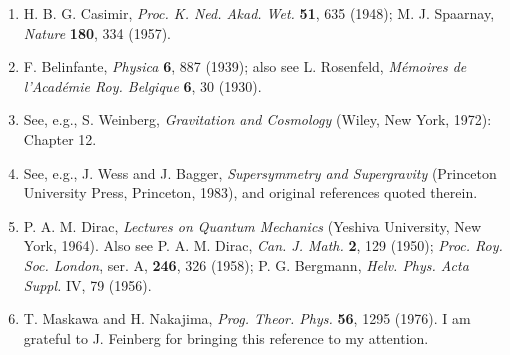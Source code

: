 
\begin{enumerate}
\item \label{ref:7.1} H. B. G. Casimir, \emph{Proc. K. Ned. Akad. Wet.} \textbf{51}, 635
(1948); M. J. Spaarnay, \emph{Nature} \textbf{180}, 334 (1957).

\item \label{ref:7.2} F. Belinfante, \emph{Physica} \textbf{6}, 887 (1939); also see
L. Rosenfeld, \emph{M\'emoires de l'Acad\'emie Roy. Belgique} \textbf{6}, 30
(1930).

\item \label{ref:7.3} See, e.g., S. Weinberg, \emph{Gravitation and Cosmology} (Wiley, New
York, 1972): Chapter 12.

\item \label{ref:7.4} See, e.g., J. Wess and J. Bagger, \emph{Supersymmetry and Supergravity}
(Princeton University Press, Princeton, 1983), and original references quoted
therein.

\item \label{ref:7.5} P. A. M. Dirac, \emph{Lectures on Quantum Mechanics} (Yeshiva
University, New York, 1964). Also see P. A. M. Dirac, \emph{Can. J. Math.}
\textbf{2}, 129 (1950); \emph{Proc. Roy. Soc. London}, ser. A, \textbf{246},
326 (1958); P. G. Bergmann, \emph{Helv. Phys. Acta Suppl.} IV, 79 (1956).

\item \label{ref:7.6} T. Maskawa and H. Nakajima, \emph{Prog. Theor. Phys.} \textbf{56},
1295 (1976). I am grateful to J. Feinberg for bringing this reference to my
attention.
\end{enumerate}
